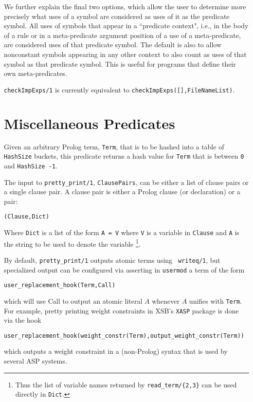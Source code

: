 \begin{description}
We further explain the final two options, which allow the user to
determine more precisely what uses of a symbol are considered as uses
of it as the predicate symbol.  All uses of symbols that appear in a
``predicate context", i.e., in the body of a rule or in a
meta-predicate argument position of a use of a meta-predicate, are
considered uses of that predicate symbol.  The default is also to
allow nonconstant symbols appearing in any other context to also count
as uses of that symbol as that predicate symbol.  This is useful for
programs that define their own meta-predicates.

%
{\tt checkImpExps/1}  is
currently equivalent to {\tt checkImpExps([],FileNameList)}.
\end{description}

\section{Miscellaneous Predicates}

\begin{description}

%
Given an arbitrary Prolog term, {\tt Term}, that is to be hashed into
a table of {\tt HashSize} buckets, this predicate returns a hash value
for {\tt Term} that is between {\tt 0} and {\tt HashSize -1}.

%
The input to {\tt pretty\_print/1}, {\tt ClausePairs}, can be either a
list of clause pairs or a single clause pair.  A clause pair is either
a Prolog clause (or declaration) or a pair:
%
\begin{center}
{\tt (Clause,Dict)} 
\end{center}
%
Where {\tt Dict} is a list of the form {\tt A = V} where {\tt V} is a
variable in {\tt Clause} and {\tt A} is the string to be used to
denote the variable \footnote{Thus the list of variable names returned
by {\tt read\_term/\{2,3\}} can be used directly in {\tt Dict}.}.

By default, {\tt pretty\_print/1} outputs atomic terms using {\tt
writeq/1}, but specialized output can be configured via asserting in
{\tt usermod} a term of the form
%
\begin{center}
{\tt user\_replacement\_hook(Term,Call)}
\end{center}
%
which will use Call to output an atomic literal $A$ whenever $A$
unifies with {\tt Term}.  For example, pretty printing weight
constraints in XSB's {\tt XASP} package is done via the hook
%
\begin{center}
{\tt user\_replacement\_hook(weight\_constr(Term),output\_weight\_constr(Term))}
\end{center}
%
which outputs a weight constraint in a (non-Prolog) syntax that is 
used by several ASP systems.

\end{description}

